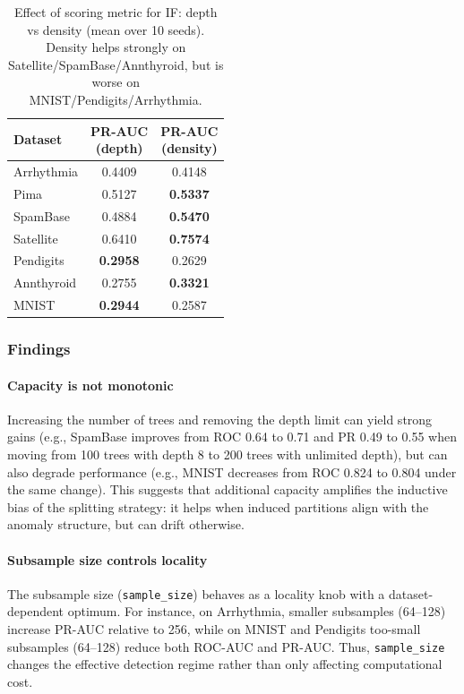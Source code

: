 \begin{table}[t]
\centering
\caption{Effect of scoring metric for IF: depth vs density (mean over 10 seeds). Density helps strongly on Satellite/SpamBase/Annthyroid, but is worse on MNIST/Pendigits/Arrhythmia.}
\label{tab:sens-scoring-metric}
\small
\setlength{\tabcolsep}{6pt}
\renewcommand{\arraystretch}{1.15}
\begin{tabular}{lcc}
\toprule
Dataset &
\shortstack{PR-AUC \\ (depth)} &
\shortstack{PR-AUC \\ (density)} \\
\midrule
Arrhythmia & 0.4409 & 0.4148 \\
Pima       & 0.5127 & \textbf{0.5337} \\
SpamBase   & 0.4884 & \textbf{0.5470} \\
Satellite  & 0.6410 & \textbf{0.7574} \\
Pendigits  & \textbf{0.2958} & 0.2629 \\
Annthyroid & 0.2755 & \textbf{0.3321} \\
MNIST      & \textbf{0.2944} & 0.2587 \\
\bottomrule
\end{tabular}
\end{table}

\subsubsection{Findings}
\paragraph{Capacity is not monotonic}
Increasing the number of trees and removing the depth limit can yield strong gains (e.g., SpamBase improves from ROC 0.64 to 0.71 and PR 0.49 to 0.55 when moving from 100 trees with depth 8 to 200 trees with unlimited depth), but can also degrade performance (e.g., MNIST decreases from ROC 0.824 to 0.804 under the same change).
This suggests that additional capacity amplifies the inductive bias of the splitting strategy: it helps when induced partitions align with the anomaly structure, but can drift otherwise.

\paragraph{Subsample size controls locality}
The subsample size (\texttt{sample\_size}) behaves as a locality knob with a dataset-dependent optimum. For instance, on Arrhythmia, smaller subsamples (64--128) increase PR-AUC relative to 256, while on MNIST and Pendigits too-small subsamples (64--128) reduce both ROC-AUC and PR-AUC.
Thus, \texttt{sample\_size} changes the effective detection regime rather than only affecting computational cost.

